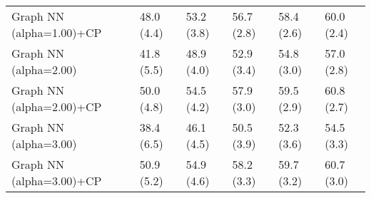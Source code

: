 \documentclass{article}
\begin{document}
\begin{table*}[t!]
\begin{center}
\begin{small}
\begin{sc}
\begin{tabular}{llllll}
Graph NN (alpha=1.00)+CP&48.0 (4.4)      &53.2 (3.8)      &56.7 (2.8)      &58.4 (2.6)      &60.0 (2.4)      \\
Graph NN (alpha=2.00)&41.8 (5.5)      &48.9 (4.0)      &52.9 (3.4)      &54.8 (3.0)      &57.0 (2.8)      \\
Graph NN (alpha=2.00)+CP&50.0 (4.8)      &54.5 (4.2)      &57.9 (3.0)      &59.5 (2.9)      &60.8 (2.7)      \\
Graph NN (alpha=3.00)&38.4 (6.5)      &46.1 (4.5)      &50.5 (3.9)      &52.3 (3.6)      &54.5 (3.3)      \\
Graph NN (alpha=3.00)+CP&50.9 (5.2)      &54.9 (4.6)      &58.2 (3.3)      &59.7 (3.2)      &60.7 (3.0)      \\
\bottomrule
\end{tabular}
\end{sc}
\end{small}
\end{center}
\vskip -0.1in
\end{table*}
\end{document}
